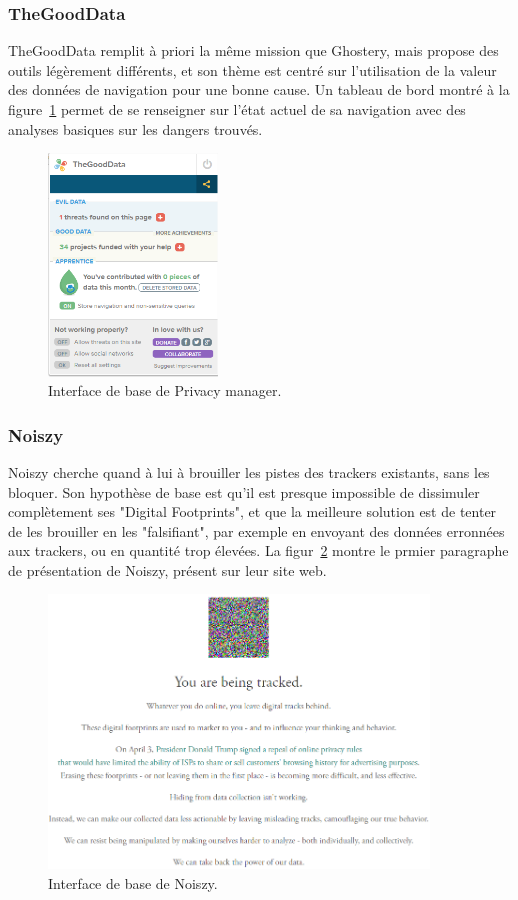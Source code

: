 			\subsubsection{TheGoodData}

				TheGoodData remplit à priori la même mission que Ghostery, mais propose des outils légèrement différents, et son thème est centré sur l'utilisation de la valeur des données de navigation pour une bonne cause. Un tableau de bord montré à la figure~\ref{a-thegooddata} permet de se renseigner sur l'état actuel de sa navigation avec des analyses basiques sur les dangers trouvés.

				\begin{figure}[ht]
					\centering
					\includegraphics[width=0.4\textwidth]{images/analysis/thegooddata}
					\caption{Interface de base de Privacy manager\cite{thegooddata}.}
					\label{a-thegooddata}
				\end{figure}

			\subsubsection{Noiszy}

				Noiszy cherche quand à lui à brouiller les pistes des trackers existants, sans les bloquer. Son hypothèse de base est qu'il est presque impossible de dissimuler complètement ses "Digital Footprints", et que la meilleure solution est de tenter de les brouiller en les "falsifiant", par exemple en envoyant des données erronnées aux trackers, ou en quantité trop élevées. La figur~\ref{a-noiszy} montre le prmier paragraphe de présentation de Noiszy, présent sur leur site web.

				\begin{figure}[ht]
					\centering
					\includegraphics[width=0.9\textwidth]{images/analysis/noiszy}
					\caption{Interface de base de Noiszy\cite{noiszy}.}
					\label{a-noiszy}
				\end{figure}